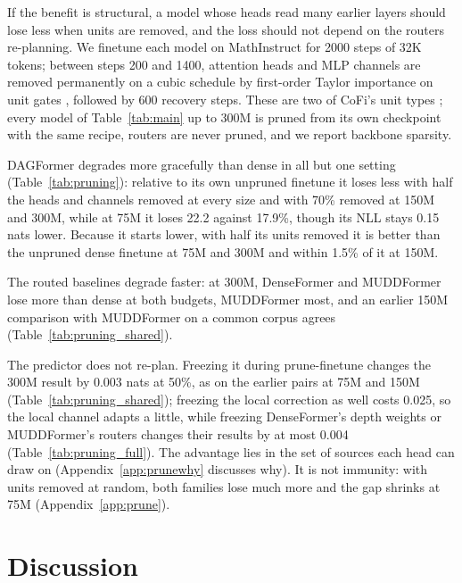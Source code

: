\documentclass[11pt]{article}
\newcommand{\dagf}{DAGFormer}
\begin{document}
If the benefit is structural, a model whose heads read many earlier layers should lose less when units are removed, and the loss should not depend on the routers re-planning. We finetune each model on MathInstruct \citep{yue2023mammoth} for 2000 steps of 32K tokens; between steps 200 and 1400, attention heads and MLP channels are removed permanently on a cubic schedule \citep{zhu2017prune} by first-order Taylor importance on unit gates \citep{michel2019heads,molchanov2019taylor}, followed by 600 recovery steps. These are two of CoFi's unit types \citep{xia2022cofi}; every model of Table~\ref{tab:main} up to 300M is pruned from its own checkpoint with the same recipe, routers are never pruned, and we report backbone sparsity.

\dagf{} degrades more gracefully than dense in all but one setting (Table~\ref{tab:pruning}): relative to its own unpruned finetune it loses less with half the heads and channels removed at every size and with 70\% removed at 150M and 300M, while at 75M it loses 22.2 against 17.9\%, though its NLL stays 0.15 nats lower. Because it starts lower, with half its units removed it is better than the unpruned dense finetune at 75M and 300M and within 1.5\% of it at 150M.

The routed baselines degrade faster: at 300M, DenseFormer and MUDDFormer lose more than dense at both budgets, MUDDFormer most, and an earlier 150M comparison with MUDDFormer on a common corpus agrees (Table~\ref{tab:pruning_shared}).

The predictor does not re-plan. Freezing it during prune-finetune changes the 300M result by 0.003 nats at 50\%, as on the earlier pairs at 75M and 150M (Table~\ref{tab:pruning_shared}); freezing the local correction as well costs 0.025, so the local channel adapts a little, while freezing DenseFormer's depth weights or MUDDFormer's routers changes their results by at most 0.004 (Table~\ref{tab:pruning_full}). The advantage lies in the set of sources each head can draw on (Appendix~\ref{app:prunewhy} discusses why). It is not immunity: with units removed at random, both families lose much more and the gap shrinks at 75M (Appendix~\ref{app:prune}).

\section{Discussion}
\label{sec:discussion}
\end{document}
